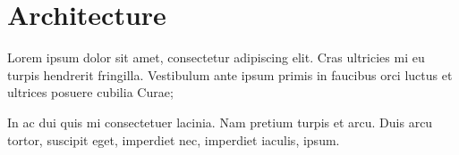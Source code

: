 \section{Architecture}

Lorem ipsum dolor sit amet, consectetur adipiscing elit. Cras ultricies mi eu turpis hendrerit fringilla. Vestibulum ante ipsum primis in faucibus orci luctus et ultrices posuere cubilia Curae;

In ac dui quis mi consectetuer lacinia. Nam pretium turpis et arcu. Duis arcu tortor, suscipit eget, imperdiet nec, imperdiet iaculis, ipsum.
